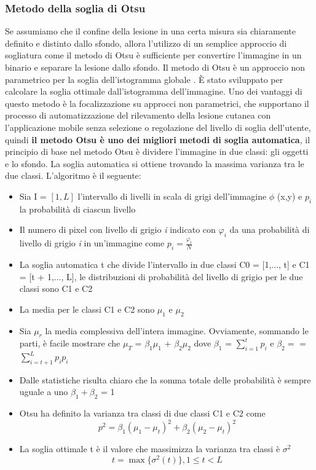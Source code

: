 {\subsubsection{Metodo della soglia di Otsu}
Se assumiamo che il confine della lesione in una certa misura sia chiaramente definito e distinto dallo sfondo, allora l'utilizzo di un semplice approccio di sogliatura come il metodo di Otsu è sufficiente per convertire l'immagine in un binario e separare la lesione dallo sfondo.
\newline
Il metodo di Otsu è un approccio non parametrico per la soglia dell'istogramma globale \cite{liu2009otsu}.
\newline
È stato sviluppato per calcolare la soglia ottimale dall'istogramma dell'immagine. Uno dei vantaggi di questo metodo è la focalizzazione su approcci non parametrici, che supportano il processo di automatizzazione del rilevamento della lesione cutanea con l'applicazione mobile senza selezione o regolazione del livello di soglia dell'utente, quindi \textbf{il metodo Otsu è uno dei migliori metodi di soglia automatica}, il principio di base nel metodo Otsu è dividere l'immagine in due classi: gli oggetti e lo sfondo.
La soglia automatica si ottiene trovando la massima
varianza tra le due classi.
L'algoritmo è il seguente:
\begin{itemize}
	\item Sia I = $[1, L]$ l'intervallo di livelli in scala di grigi dell'immagine $\phi$ (x,y) e $p_i$ la probabilità di ciascun livello
	\item Il numero di pixel con livello di grigio \textit{i} indicato con $\varphi_i$ da una probabilità di livello di grigio \textit{i} in un'immagine come $p_i=\frac{\varphi_i}{N}$
	\item La soglia automatica t che divide l'intervallo in due classi C0 = [1,..., t] e C1 = [t + 1,..., L], le distribuzioni di probabilità del livello di grigio per le due classi sono C1 e C2
	\item La media per le classi C1 e C2 sono $\mu_1$ e $\mu_2$
	\item Sia $\mu_r$ la media complessiva dell'intera immagine. Ovviamente, sommando le parti, è facile mostrare che $\mu_T$ = $\beta_1\mu_1$ + $\beta_2\mu_2$ dove $\beta_1$ = $\sum_{i=1}^{t}p_i$ e $\beta_2=$ = $\sum_{i=t+1}^{L}p_i p_i$
	\item  Dalle statistiche risulta chiaro che la somma totale delle probabilità è sempre uguale a uno $\beta_1 + \beta_2$ = 1
	\item Otsu ha definito la varianza tra classi di due classi C1 e C2 come
		\begin{equation}
		p^2=\beta_1(\mu_1 - \mu_t)^2+\beta_2(\mu_2-\mu_t)^2
		\end{equation}
	\item La soglia ottimale t è il valore che massimizza la varianza tra classi è $\sigma^2$
		\begin{equation}
		t=\max\{\sigma^2(t)\},1\leq t < L
		\end{equation}
\end{itemize}
\newpage
}
